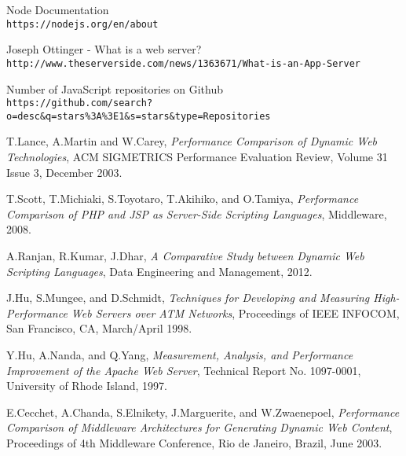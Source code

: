 
\graphicspath{{images/}}




\tableofcontents
\thispagestyle{empty}
\thesisstyle
\newpage 

%
\newpage

\newpage

\newpage

\newpage

\newpage

\newpage

\newpage
\begin{thebibliography}{9}
	Node Documentation 
	\\\texttt{https://nodejs.org/en/about}
	
	Joseph Ottinger - What is a web server?
	\\\texttt{http://www.theserverside.com/news/1363671/What-is-an-App-Server}
	
	Number of JavaScript repositories on Github
	\\\texttt{https://github.com/search?o=desc\&q=stars\%3A\%3E1\&s=stars\&type=Repositories}
	
	T.Lance, A.Martin and W.Carey,
	\textit{Performance Comparison of
		Dynamic Web Technologies}, 
	ACM SIGMETRICS Performance
	Evaluation Review, Volume 31 Issue 3, December 2003.
	
	T.Scott, T.Michiaki, S.Toyotaro, T.Akihiko, and O.Tamiya,
	\textit{Performance Comparison of PHP and JSP as Server-Side Scripting
		Languages}, 
	Middleware, 2008.
	
	A.Ranjan, R.Kumar, J.Dhar,
	\textit{A Comparative Study between Dynamic
		Web Scripting Languages}, 
	Data Engineering and Management, 2012.
	
	J.Hu, S.Mungee, and D.Schmidt,
	\textit{Techniques for Developing and
		Measuring High-Performance Web Servers over ATM Networks}, 
	Proceedings of IEEE INFOCOM, San Francisco, CA, March/April 1998.
	
	Y.Hu, A.Nanda, and Q.Yang,
	\textit{Measurement, Analysis, and
		Performance Improvement of the Apache Web Server}, 
	Technical
	Report No. 1097-0001, University of Rhode Island, 1997.
	
	E.Cecchet, A.Chanda, S.Elnikety, J.Marguerite, and W.Zwaenepoel,
	\textit{Performance Comparison of Middleware Architectures for Generating
		Dynamic Web Content}, 
	Proceedings of 4th Middleware Conference,
	Rio de Janeiro, Brazil, June 2003.
	

\end{thebibliography}
